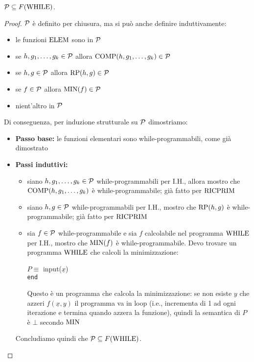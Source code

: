 \begin{theor}
	$\mathcal{P} \subseteq F(\text{WHILE})$.
\end{theor}
\begin{proof}
	$\mathcal{P}$ è definito per chiusura, ma si può anche definire induttivamente:
	\begin{itemize}
		\item le funzioni $\text{ELEM}$ sono in $\mathcal{P}$
		\item se $h, g_1, \dots, g_k \in \mathcal{P}$ allora $\text{COMP} (h, g_1, \dots, g_k) \in \mathcal{P}$
		\item se $h,g \in \mathcal{P}$ allora $\text{RP} (h,g) \in \mathcal{P}$
		\item se $f \in \mathcal{P}$ allora $\operatorname{MIN}(f) \in \mathcal{P}$
		\item nient'altro in $\mathcal{P}$
	\end{itemize}
	
	Di conseguenza, per induzione strutturale su $\mathcal{P}$ dimostriamo:
	\begin{itemize}
		\item \textbf{Passo base:} le funzioni elementari sono while-programmabili, come già dimostrato
		\item \textbf{Passi induttivi:}
		\begin{itemize}
			\item siano $h,g_1, \dots, g_k \in \mathcal{P}$ while-programmabili per I.H., allora mostro che $\text{COMP} (h, g_1, \dots, g_k)$ è while-programmabile; già fatto per $\text{RICPRIM}$
			\item siano $h,g \in \mathcal{P}$ while-programmabili per I.H., mostro che $\text{RP}(h,g)$ è while-programmabile; già fatto per $\text{RICPRIM}$
			\item sia $f \in \mathcal{P}$ while-programmabile e sia $f$ calcolabile nel programma $\text{WHILE}$ per I.H., mostro che $\operatorname{MIN}(f)$ è while-programmabile. Devo trovare un programma $\text{WHILE}$ che calcoli la minimizzazione:
			\begin{center}
				\begin{minipage}{.85\textwidth}
					\begin{tcolorbox}[colback=white,sharp corners,boxrule=.3mm]
						\begin{algorithm}[H]
							\SetAlgoNoEnd
							$P \equiv$ input($\underline{x}$) \\
							\texttt{end}
						\end{algorithm}
					\end{tcolorbox} 
				\end{minipage}
			\end{center}
			Questo è un programma che calcola la minimizzazione: se non esiste $y$ che azzeri $f(\underline{x}, y)$ il programma va in loop (i.e., incrementa di 1 ad ogni iterazione e termina quando azzera la funzione), quindi la semantica di $P$ è $\bot$ secondo $\operatorname{MIN}$
		\end{itemize}
		Concludiamo quindi che $\mathcal{P} \subseteq F(\text{WHILE})$.
	\end{itemize}
  \end{proof}

